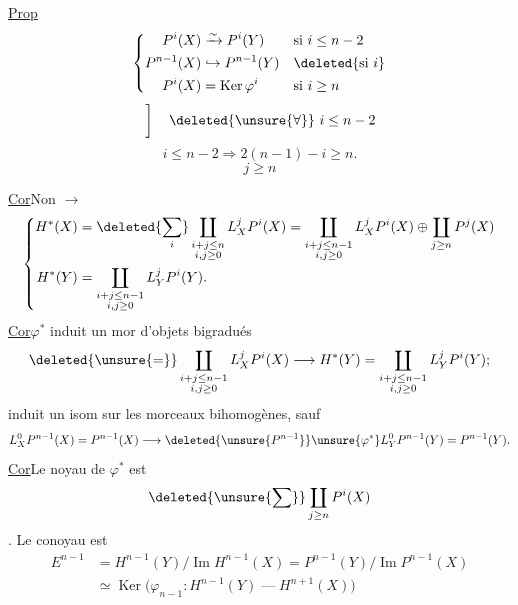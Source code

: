 \uline{Prop}
\[
\left\{\begin{aligned}
P^i(X)&\xrightarrow{\sim}P^i(Y) &&\text{si }i\leq n-2\\
P^{n-1}(X)&\hookrightarrow P^{n-1}(Y) &&\deleted{\text{si }i}\\
P^i(X)&=\operatorname{Ker}\varphi^i &&\text{si }i\geq n
\end{aligned}\right.
\]
\[\left.\vphantom{\begin{matrix}H^i(X)\\H^i(Y)\end{matrix}}\right]\quad\deleted{\unsure{\forall}}\ i\leq n-2\]
\[i\leq n-2\Rightarrow 2(n-1)-i\geq n.\]
\[j\geq n\]

\uline{Cor}\qquad Non $\longrightarrow$
\[
\left\{\begin{aligned}
H^*(X)&=\deleted{\sum_i}\coprod_{\substack{i+j\leq n\\i,j\geq0}}L_X^jP^i(X)
=\coprod_{\substack{i+j\leq n-1\\i,j\geq0}}L_X^jP^i(X)\oplus\coprod_{j\geq n}P^j(X)\\
H^*(Y)&=\coprod_{\substack{i+j\leq n-1\\i,j\geq0}}L_Y^jP^i(Y).
\end{aligned}\right.
\]
\uline{Cor}\qquad $\varphi^*$ induit un mor d'objets bigradués
\[
\deleted{\unsure{=}}\coprod_{\substack{i+j\leq n-1\\i,j\geq0}}L_X^jP^i(X)
\longrightarrow H^*(Y)=\coprod_{\substack{i+j\leq n-1\\i,j\geq0}}L_Y^jP^i(Y);\]
 induit un isom sur les morceaux bihomogènes, sauf
\[
L_X^0P^{n-1}(X)=P^{n-1}(X)\longrightarrow\deleted{\unsure{P^{n-1}}}\unsure{\varphi^*}L_Y^0P^{n-1}(Y)=P^{n-1}(Y).
\]
\uline{Cor}\qquad Le noyau de $\varphi^*$ est 
\[\deleted{\unsure{\sum}}\coprod_{j\geq n}P^i(X)\]
. Le conoyau est
\[
\begin{aligned}
E^{n-1}&=H^{n-1}(Y)/\operatorname{Im}H^{n-1}(X)=P^{n-1}(Y)/\operatorname{Im}P^{n-1}(X)\\
&\simeq\operatorname{Ker}\bigl(\varphi_{n-1}:H^{n-1}(Y)\mathrel{\text{---}}H^{n+1}(X)\bigr)
\end{aligned}
\]
